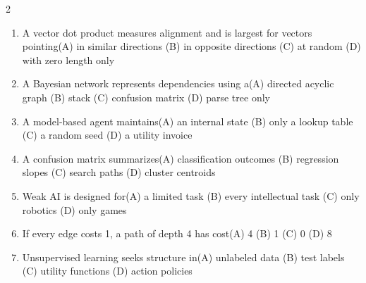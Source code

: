 \documentclass[a4paper]{article}
\begin{document}
\begin{multicols*}{2}
\begin{enumerate}
\item A vector dot product measures alignment and is largest for vectors pointing\newline\hspace*{0.6em}(A) in similar directions \quad (B) in opposite directions \newline\hspace*{0.6em}(C) at random \quad (D) with zero length only
\item A Bayesian network represents dependencies using a\newline\hspace*{0.6em}(A) directed acyclic graph \quad (B) stack \newline\hspace*{0.6em}(C) confusion matrix \quad (D) parse tree only
\item A model-based agent maintains\newline\hspace*{0.6em}(A) an internal state \quad (B) only a lookup table \newline\hspace*{0.6em}(C) a random seed \quad (D) a utility invoice
\item A confusion matrix summarizes\newline\hspace*{0.6em}(A) classification outcomes \quad (B) regression slopes \newline\hspace*{0.6em}(C) search paths \quad (D) cluster centroids
\item Weak AI is designed for\newline\hspace*{0.6em}(A) a limited task \quad (B) every intellectual task \newline\hspace*{0.6em}(C) only robotics \quad (D) only games
\item If every edge costs 1, a path of depth 4 has cost\newline\hspace*{0.6em}(A) 4 \quad (B) 1 \newline\hspace*{0.6em}(C) 0 \quad (D) 8
\item Unsupervised learning seeks structure in\newline\hspace*{0.6em}(A) unlabeled data \quad (B) test labels \newline\hspace*{0.6em}(C) utility functions \quad (D) action policies

\end{enumerate}
\end{multicols*}
\end{document}
